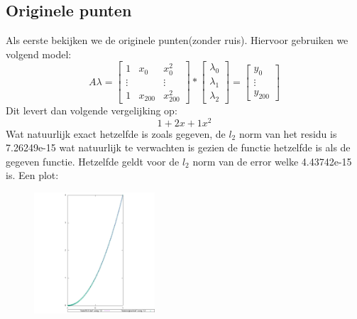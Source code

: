 \documentclass[10pt,a4paper,twocolumn]{article}
\begin{document}
\subsection{Originele punten}
Als eerste bekijken we de originele punten(zonder ruis). Hiervoor gebruiken we volgend model:
$$
A \lambda = \begin{bmatrix}
1 & x_{0} & x^{2}_{0} \\ 
\vdots &  & \vdots\\ 
1 & x_{200} & x^{2}_{200}
\end{bmatrix}
* \begin{bmatrix}
\lambda_{0} \\
\lambda_{1}  \\
\lambda_{2} 
\end{bmatrix}
= \begin{bmatrix}
y_{0} \\
\vdots  \\
y_{200}
\end{bmatrix}
$$
Dit levert dan volgende vergelijking op:
$$1 + 2x + 1x^2$$
Wat natuurlijk exact hetzelfde is zoals gegeven, de $l_{2}$ norm van het residu is 7.26249e-15 wat natuurlijk te verwachten is gezien de functie hetzelfde is als de gegeven functie.  Hetzelfde geldt voor de $l_{2}$ norm van de error welke 4.43742e-15 is. Een plot:
\begin{figure}[H]
\includegraphics[width=0.4\textwidth]{OLS}
\end{figure}
\end{document}

